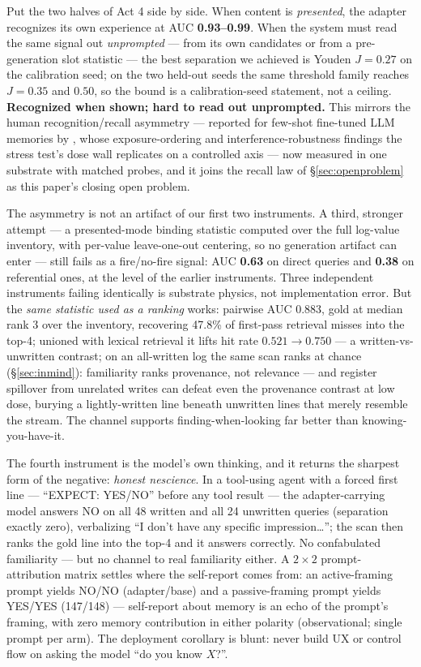 \documentclass[11pt]{article}
\begin{document}
Put the two halves of Act 4 side by side. When content is \emph{presented}, the adapter
recognizes its own experience at AUC \textbf{0.93--0.99}. When the system must read the same
signal out \emph{unprompted} --- from its own candidates or from a pre-generation slot statistic
--- the best separation we achieved is Youden $J = 0.27$ on the calibration seed; on the two
held-out seeds the same threshold family reaches $J = 0.35$ and $0.50$, so the bound is a
calibration-seed statement, not a ceiling. \textbf{Recognized when shown; hard
to read out unprompted.} This mirrors the human recognition/recall asymmetry --- reported
for few-shot fine-tuned LLM memories by \citet{orhan2023recognition}, whose
exposure-ordering and interference-robustness findings the stress test's dose wall
replicates on a controlled axis --- now measured in
one substrate with matched probes, and it joins the recall law of \S\ref{sec:openproblem} as
this paper's closing open problem.

The asymmetry is not an artifact of our first two instruments. A third, stronger attempt --- a
presented-mode binding statistic computed over the full log-value inventory, with per-value
leave-one-out centering, so no generation artifact can enter --- still fails as a fire/no-fire
signal: AUC \textbf{0.63} on direct queries and \textbf{0.38} on referential ones, at the level
of the earlier instruments. Three independent instruments failing identically is substrate
physics, not implementation error. But the \emph{same statistic used as a ranking} works:
pairwise AUC 0.883, gold at median rank 3 over the inventory, recovering 47.8\% of first-pass
retrieval misses into the top-4; unioned with lexical retrieval it lifts hit rate
$0.521\to0.750$ --- a written-vs-unwritten contrast; on an all-written log the same scan ranks
at chance (\S\ref{sec:inmind}): familiarity ranks provenance, not relevance --- and register
spillover from unrelated writes can defeat even the provenance contrast at low dose, burying
a lightly-written line beneath unwritten lines that merely resemble the stream. The channel
supports finding-when-looking far better than knowing-you-have-it.

The fourth instrument is the model's own thinking, and it returns the sharpest form of the
negative: \emph{honest nescience}. In a tool-using agent with a forced first line ---
``EXPECT: YES/NO'' before any tool result --- the adapter-carrying model answers NO on all 48
written and all 24 unwritten queries (separation exactly zero), verbalizing ``I don't have any
specific impression\ldots''; the scan then ranks the gold line into the top-4 and it answers
correctly. No confabulated familiarity --- but no channel to real familiarity either. A
$2\times2$ prompt-attribution matrix settles where the self-report comes from: an
active-framing prompt yields NO/NO (adapter/base) and a passive-framing prompt yields YES/YES
(147/148) --- self-report about memory is an echo of the prompt's framing, with zero memory
contribution in either polarity (observational; single prompt per arm). The deployment
corollary is blunt: never build UX or control flow on asking the model ``do you know $X$?''.
\end{document}
